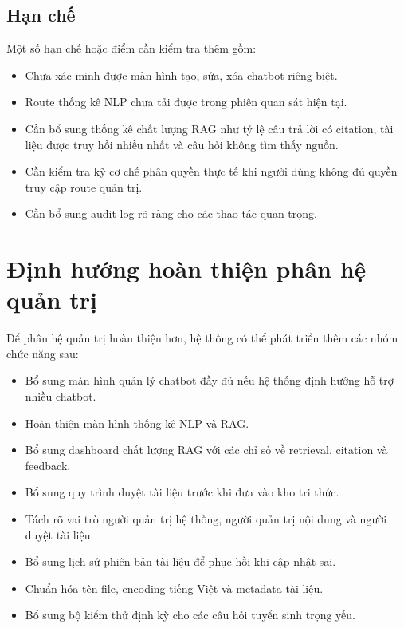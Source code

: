 \documentclass[12pt,a4paper]{report}
\begin{document}
\subsection{Hạn chế}

Một số hạn chế hoặc điểm cần kiểm tra thêm gồm:

\begin{itemize}
    \item Chưa xác minh được màn hình tạo, sửa, xóa chatbot riêng biệt.
    \item Route thống kê NLP chưa tải được trong phiên quan sát hiện tại.
    \item Cần bổ sung thống kê chất lượng RAG như tỷ lệ câu trả lời có citation, tài liệu được truy hồi nhiều nhất và câu hỏi không tìm thấy nguồn.
    \item Cần kiểm tra kỹ cơ chế phân quyền thực tế khi người dùng không đủ quyền truy cập route quản trị.
    \item Cần bổ sung audit log rõ ràng cho các thao tác quan trọng.
\end{itemize}

\section{Định hướng hoàn thiện phân hệ quản trị}

Để phân hệ quản trị hoàn thiện hơn, hệ thống có thể phát triển thêm các nhóm chức năng sau:

\begin{itemize}
    \item Bổ sung màn hình quản lý chatbot đầy đủ nếu hệ thống định hướng hỗ trợ nhiều chatbot.
    \item Hoàn thiện màn hình thống kê NLP và RAG.
    \item Bổ sung dashboard chất lượng RAG với các chỉ số về retrieval, citation và feedback.
    \item Bổ sung quy trình duyệt tài liệu trước khi đưa vào kho tri thức.
    \item Tách rõ vai trò người quản trị hệ thống, người quản trị nội dung và người duyệt tài liệu.
    \item Bổ sung lịch sử phiên bản tài liệu để phục hồi khi cập nhật sai.
    \item Chuẩn hóa tên file, encoding tiếng Việt và metadata tài liệu.
    \item Bổ sung bộ kiểm thử định kỳ cho các câu hỏi tuyển sinh trọng yếu.
\end{itemize}
\end{document}
